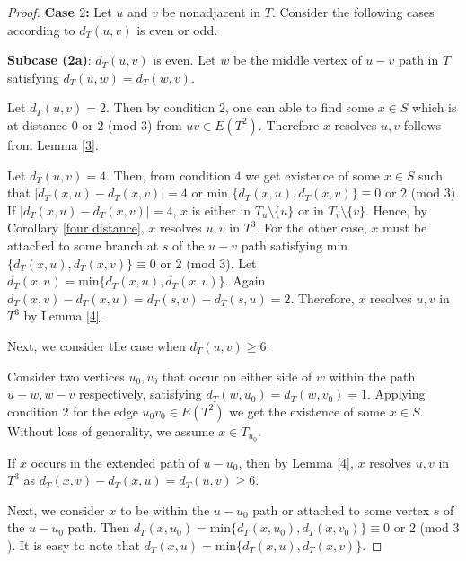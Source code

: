 \documentclass{article}
\theoremstyle{definition}
\numberwithin{equation}{section}
\begin{document}
\begin{proof}
\vspace{0.7em}
\noindent  \textbf{Case $2$:} Let $u$ and $v$ be nonadjacent in $T$. Consider the following cases according to $d_{T}(u,v)$ is even or odd.

\vspace{0.7em}
\noindent \textbf{Subcase (2a)}: $d_{T}(u,v)$ is even. Let $w$ be the middle vertex of $u-v$ path in $T$ satisfying $d_{T}(u,w)=d_{T}(w,v)$. 

\vspace{0.7em}
 Let $d_{T}(u,v)=2$. Then by condition $2$, one can able to find some $x\in S$ which is at distance $0$ or $2$ (mod $3$) from $uv\in E(T^{2})$. Therefore $x$ resolves $u,v$ follows from Lemma \ref{3}.



\vspace{0.4em}
Let $d_{T}(u,v)=4$. Then, from condition $4$ we get existence of some $x\in S$ such that $|d_{T}(x,u)-d_{T}(x,v)|=4$ or min $\{d_{T}(x,u),d_{T}(x,v)\}\equiv 0$ or $2$ (mod $3$). If $|d_{T}(x,u)-d_{T}(x,v)|=4$, $x$ is either in $T_{u}\setminus\{u\}$ or in $T_{v}\setminus\{v\}$. Hence, by Corollary \ref{four distance}, $x$ resolves $u,v$ in $T^{3}$. For the other case, $x$ must be attached to some branch at $s$ of the $u-v$ path satisfying min $\{d_{T}(x,u),d_{T}(x,v)\}\equiv 0$ or $2$ (mod $3$). Let $d_{T}(x,u)=\mbox{min} \{d_{T}(x,u),d_{T}(x,v)\}$.  Again $d_{T}(x,v)-d_{T}(x,u)=d_{T}(s,v)-d_{T}(s,u)=2$. Therefore, $x$ resolves $u,v$ in $T^{3}$ by Lemma \ref{4}.


\vspace{0.7em}
\noindent Next, we consider the case when $d_{T}(u,v)\geq 6$.
\vspace{0.37em}

Consider two vertices $u_{0},v_{0}$ that occur on either side of $w$ within the path $u-w, w-v$ respectively, satisfying $d_{T}(w,u_{0})=d_{T}(w,v_{0})=1$. Applying condition $2$ for the edge $u_{0}v_{0}\in E(T^{2})$ we get the existence of some $x\in S$. Without loss of generality, we assume $x\in T_{u_{0}}$.

\vspace{0.3em}
If $x$ occurs in the extended path of $u-u_{0}$, then by Lemma \ref{4}, $x$ resolves $u,v$ in $T^{3}$ as $d_{T}(x,v)-d_{T}(x,u)=d_{T}(u,v)\geq 6$.

\vspace{0.3em}

Next, we consider $x$ to be within the $u-u_{0}$ path or attached to some vertex $s$ of the $u-u_{0}$ path. Then $d_{T}(x,u_{0})=\mbox{min}\{d_{T}(x,u_{0}),d_{T}(x,v_{0})\}\equiv 0$ or $2$ (mod $3$). It is easy to note that 
$d_{T}(x,u)=\mbox{min}\{d_{T}(x,u),d_{T}(x,v)\}$.


\end{proof}
\end{document}
